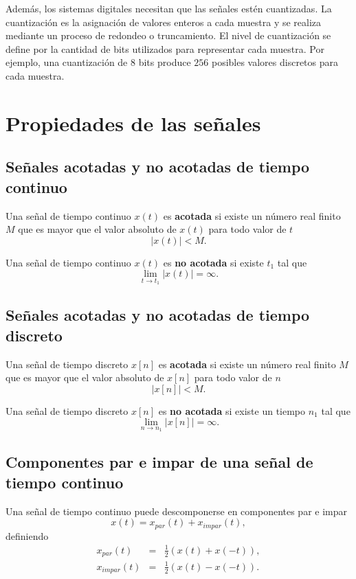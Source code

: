 \documentclass[11pt,a4paper,openany]{book}
\begin{document}
Además, los sistemas digitales necesitan que las señales estén cuantizadas. La cuantización es la asignación de valores enteros a cada muestra y se realiza mediante un proceso de redondeo o truncamiento. El nivel de cuantización se define por la cantidad de bits utilizados para representar cada muestra. Por ejemplo, una cuantización de $8$ bits produce $256$ posibles valores discretos para cada muestra.

\section{Propiedades de las señales}

\subsection{Señales acotadas y no acotadas de tiempo continuo}
Una señal de tiempo continuo $x(t)$ es \textbf{acotada} si existe un número real finito $M$ que es mayor que el valor absoluto de $x(t)$ para todo valor de $t$
\begin{equation}
	|x(t)| < M.
\end{equation}

Una señal de tiempo continuo $x(t)$ es \textbf{no acotada} si existe $t_{1}$ tal que
\begin{equation}
	\lim_{t \rightarrow t_{1}} |x(t)| = \infty.
\end{equation}

\subsection{Señales acotadas y no acotadas de tiempo discreto}
Una señal de tiempo discreto $x[n]$ es \textbf{acotada} si existe un número real finito $M$ que es mayor que el valor absoluto de $x[n]$ para todo valor de $n$
\begin{equation}
	|x[n]| < M.
\end{equation}

Una señal de tiempo discreto $x[n]$ es \textbf{no acotada} si existe un tiempo $n_{1}$ tal que
\begin{equation}
	\lim_{n \rightarrow n_{1}} |x[n]| = \infty.
\end{equation}

\subsection{Componentes par e impar de una señal de tiempo continuo}
Una señal de tiempo continuo puede descomponerse en componentes par e impar
\begin{equation}
	x(t) = x_{par}(t) + x_{impar}(t),
\end{equation}
definiendo
\begin{eqnarray}
	x_{par}(t) &=& \frac{1}{2}\left( x(t) + x(-t) \right) , \\
	x_{impar}(t) &=& \frac{1}{2}\left( x(t) - x(-t) \right) .
\end{eqnarray}
\end{document}
